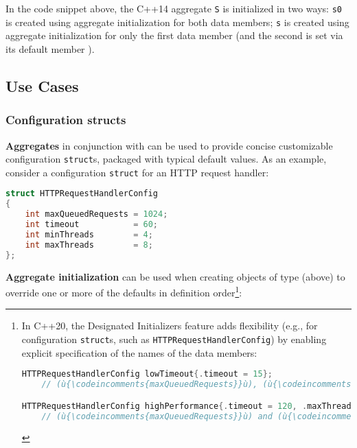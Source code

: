 \noindent In the code snippet above, the C++14 aggregate \texttt{S} is initialized
in two ways: \texttt{s0} is created using aggregate initialization for
both data members; \texttt{s} is created using aggregate
initialization for only the first data member (and the second is set via its
default member ).

\subsection[Use Cases]{Use Cases}\label{use-cases}

\subsubsection[Configuration \tt{struct}s]{Configuration {\SubsubsecCode struct}s}\label{configuration-structs}

\textbf{Aggregates} in conjunction with  can be used to provide concise customizable
configuration \texttt{struct}s, packaged with typical default values. As
an example, consider a configuration \texttt{struct} for an HTTP request
handler:

\begin{lstlisting}[language=C++]
struct HTTPRequestHandlerConfig
{
    int maxQueuedRequests = 1024;
    int timeout           = 60;
    int minThreads        = 4;
    int maxThreads        = 8;
};
\end{lstlisting}
    
\noindent \textbf{Aggregate initialization} can be used when creating objects of
type  (above) to override one or more
of the defaults in definition order{\cprotect\footnote{In C++20, the
Designated Initializers feature adds flexibility (e.g., for
configuration \texttt{struct}s, such as
\texttt{HTTPRequestHandlerConfig}) by enabling explicit specification
of the names of the data members:

\begin{lstlisting}[language=C++, basicstyle={\ttfamily\footnotesize}]
HTTPRequestHandlerConfig lowTimeout{.timeout = 15};
    // (ù{\codeincomments{maxQueuedRequests}}ù), (ù{\codeincomments{minThreads}}ù), and (ù{\codeincomments{maxThreads}}ù) have their default value.

HTTPRequestHandlerConfig highPerformance{.timeout = 120, .maxThreads = 16};
    // (ù{\codeincomments{maxQueuedRequests}}ù) and (ù{\codeincomments{minThreads}}ù) have their default value.
\end{lstlisting}
      }}:

